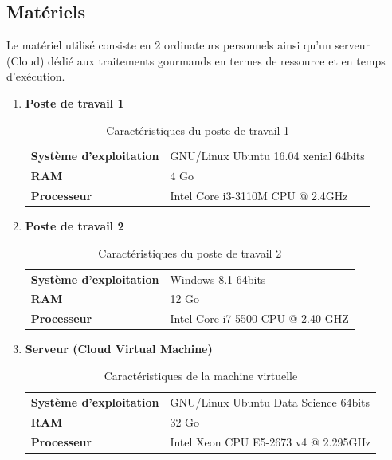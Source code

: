 \subsection{Matériels}
Le matériel utilisé consiste en 2 ordinateurs personnels ainsi qu'un serveur (Cloud) dédié aux traitements gourmands en termes de ressource et en temps d'exécution.
\begin{enumerate}
    \item{\textbf{Poste de travail 1}}
    \begin{table}[h!]
        \begin{center}
            \begin{tabular}{|C{5cm}|C{8cm}|}
                \hline
                \textbf{Système d'exploitation} &  GNU/Linux Ubuntu 16.04 xenial 64bits \\
                \textbf{RAM} &  4 Go \\
                \textbf{Processeur} & Intel Core i3-3110M CPU @ 2.4GHz \\
                \hline
            \end{tabular}
        \end{center}
        \caption{Caractéristiques du poste de travail 1}
    \end{table}
    
    \item{\textbf{Poste de travail 2}}
    \begin{table}[h!]
        \begin{center}
            \begin{tabular}{|C{5cm}|C{8cm}|}
                \hline
                \textbf{Système d'exploitation} &  Windows 8.1 64bits \\
                \textbf{RAM} &  12 Go \\
                \textbf{Processeur} & Intel Core i7-5500 CPU @ 2.40 GHZ \\
                \hline
            \end{tabular}
        \end{center}
        \caption{Caractéristiques du poste de travail 2}
    \end{table}
    
    \item{\textbf{Serveur (Cloud Virtual Machine)}}
    \begin{table}[h!]
        \begin{center}
            \begin{tabular}{|C{5cm}|C{8cm}|}
                \hline
                \textbf{Système d'exploitation} &  GNU/Linux Ubuntu Data Science 64bits \\
                \textbf{RAM} &  32 Go \\
                \textbf{Processeur} & Intel Xeon CPU E5-2673 v4 @ 2.295GHz \\
                \hline
            \end{tabular}
        \end{center}
        \caption{Caractéristiques de la machine virtuelle}
    \end{table}
\end{enumerate}   

